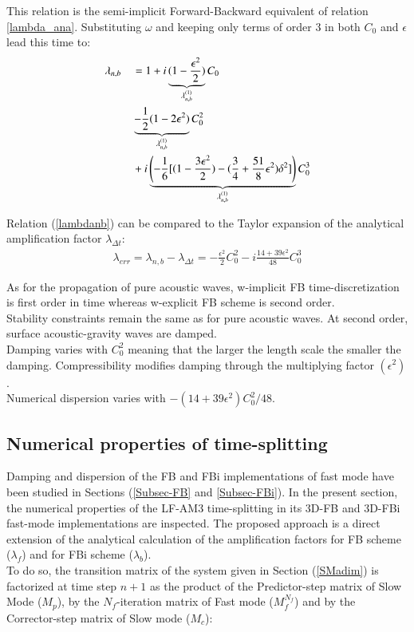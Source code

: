 \documentclass[a4paper,11pt]{article}
\begin{document}
This relation is the semi-implicit Forward-Backward equivalent of relation \eqref{lambda_ana}. 
Substituting $\omega$ and keeping only terms of order 3 in both $C_0$ and $\epsilon$ lead this time to:
\begin{equation}
   \label{lambdanb}
   \begin{split}
    \displaystyle
     &\lambda_{n,b} &&= 1  + i \underbrace{(1-\frac{\epsilon^2}{2})}_{\lambda_{n,b}^{(1)}}C_0\\
     & &&\underbrace{-\frac{1}{2}(1-2\epsilon^2)}_{\lambda_{n,b}^{(1)}} C_0^2\\
     & && +i \underbrace{\left(-\frac{1}{6}[(1-\frac{3\epsilon^2}{2})
     -(\frac{3}{4}+\frac{51}{8}\epsilon^2)\delta^2]\right)}_{\lambda_{n,b}^{(1)}} C_0^3
   \end{split}
\end{equation}

Relation (\ref{lambdanb}) can be compared to the Taylor expansion of the analytical amplification factor $\lambda_{\Delta t}$:
\begin{equation}
   \begin{split}
    \displaystyle
     \lambda_{err}=\lambda_{n,b}-\lambda_{\Delta t}=
     -\frac{\epsilon^2}{2} C_0^2
     -i\frac{ 14 + 39 \epsilon^2 }{48}C_0^3
   \end{split}
\end{equation}

As for the propagation of pure acoustic waves, w-implicit FB time-discretization is first order in time whereas w-explicit FB scheme is second order.\\
Stability constraints remain the same as for pure acoustic waves. At second order, surface acoustic-gravity waves are damped. \\
Damping varies with $C_0^2$ meaning that the larger the length scale the smaller the damping. Compressibility modifies damping through the multiplying factor $(\epsilon^2)$.\\
Numerical dispersion varies with $-(14 + 39 \epsilon^2)C_0^2/48$.
   
\subsection{Numerical properties of time-splitting}

Damping and dispersion of the FB and FBi implementations of fast mode have been studied in Sections (\ref{Subsec-FB} and \ref{Subsec-FBi}). In the present section, the numerical properties of the LF-AM3 time-splitting in its 3D-FB and 3D-FBi fast-mode implementations are inspected. 
The proposed approach is a direct extension of the analytical calculation of the amplification factors for FB scheme ($\lambda_f$) and for FBi scheme ($\lambda_b$).\\
To do so, the transition matrix of the system given in Section (\ref{SMadim}) is factorized at time step $n+1$ as the product of the Predictor-step matrix of Slow Mode ($M_p$), by the $N_f$-iteration matrix of Fast mode ($M_f^{N_f}$) and by the Corrector-step matrix of Slow mode ($M_c$): 
 
\end{document}
